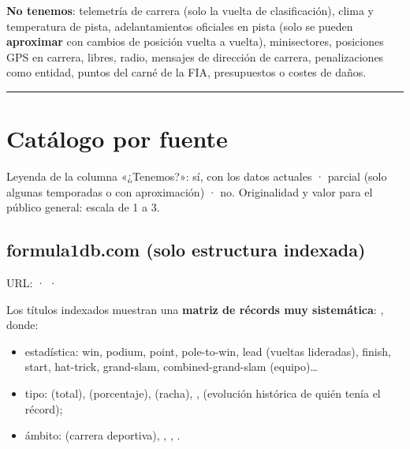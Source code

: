 \textbf{No tenemos}: telemetría de carrera (solo la vuelta de clasificación), clima y temperatura de pista, adelantamientos oficiales en pista (solo se pueden \textbf{aproximar} con cambios de posición vuelta a vuelta), minisectores, posiciones GPS en carrera, libres, radio, mensajes de dirección de carrera, penalizaciones como entidad, puntos del carné de la FIA, presupuestos o costes de daños.

\medskip\noindent\textcolor{muted!40}{\rule{\linewidth}{0.3pt}}\medskip

\section{Catálogo por fuente}

Leyenda de la columna «¿Tenemos?»: \si{} sí, con los datos actuales · \parcial{} parcial (solo algunas temporadas o con aproximación) · \no{} no. Originalidad y valor para el público general: escala de 1 a 3.

\subsection{formula1db.com (solo estructura indexada)}

URL: \href{https://www.formula1db.com/record}{} · \href{https://www.formula1db.com/races}{} · \href{https://www.formula1db.com/seasons}{}

Los títulos indexados muestran una \textbf{matriz de récords muy sistemática}: , donde:

\begin{itemize}
\item estadística: win, podium, point, pole-to-win, lead (vueltas lideradas), finish, start, hat-trick, grand-slam, combined-grand-slam (equipo)…
\item tipo:  (total),  (porcentaje),  (racha), ,  (evolución histórica de quién tenía el récord);
\item ámbito:  (carrera deportiva), , , .
\end{itemize}

